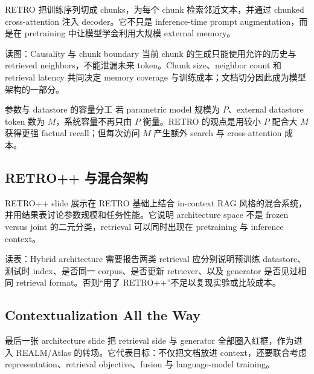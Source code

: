 RETRO 把训练序列切成 chunks，为每个 chunk 检索邻近文本，并通过 chunked cross-attention 注入 decoder。它不只是 inference-time prompt augmentation，而是在 pretraining 中让模型学会利用大规模 external memory。


\begin{knowledgebox}{读图：Causality 与 chunk boundary}
当前 chunk 的生成只能使用允许的历史与 retrieved neighbors，不能泄漏未来 token。Chunk size、neighbor count 和 retrieval latency 共同决定 memory coverage 与训练成本；文档切分因此成为模型架构的一部分。
\end{knowledgebox}

\begin{importantbox}{参数与 datastore 的容量分工}
若 parametric model 规模为 $P$、external datastore token 数为 $M$，系统容量不再只由 $P$ 衡量。RETRO 的观点是用较小 $P$ 配合大 $M$ 获得更强 factual recall；但每次访问 $M$ 产生额外 search 与 cross-attention 成本。
\end{importantbox}

\subsection{RETRO++ 与混合架构}

RETRO++ slide 展示在 RETRO 基础上结合 in-context RAG 风格的混合系统，并用结果表讨论参数规模和任务性能。它说明 architecture space 不是 frozen versus joint 的二元分类，retrieval 可以同时出现在 pretraining 与 inference context。


\begin{knowledgebox}{读表：Hybrid architecture 需要报告两类 retrieval}
应分别说明预训练 datastore、测试时 index、是否同一 corpus、是否更新 retriever、以及 generator 是否见过相同 retrieval format。否则“用了 RETRO++”不足以复现实验或比较成本。
\end{knowledgebox}

\subsection{Contextualization All the Way}

最后一张 architecture slide 把 retrieval side 与 generator 全部圈入红框，作为进入 REALM/Atlas 的转场。它代表目标：不仅把文档放进 context，还要联合考虑 representation、retrieval objective、fusion 与 language-model training。

